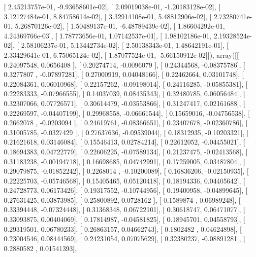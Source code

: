 \documentclass{article}
\begin{document}
       [  2.45213757e-01,  -9.93658601e-02],
       [  2.09019038e-01,  -1.20183128e-02],
       [  3.12127484e-01,   8.84758614e-02],
       [  3.32914108e-01,   5.48812906e-02],
       [  2.73280741e-01,   5.26870126e-02],
       [  1.50489137e-01,  -6.48789439e-02],
       [  1.86604292e-01,   4.24369766e-03],
       [  1.78773656e-01,   1.07142537e-01],
       [  1.98102186e-01,   2.19328524e-02],
       [  2.58106237e-01,   5.13442734e-02],
       [  2.50138343e-01,   1.48642191e-01],
       [  2.33429641e-01,   6.75065124e-02],
       [  1.87077524e-01,  -5.66150912e-02]]), array([[ 0.24097548,  0.0656408 ],
       [ 0.20274714, -0.0096079 ],
       [ 0.24344568, -0.08375786],
       [ 0.3277807 , -0.07897281],
       [ 0.27000919,  0.04048166],
       [ 0.22462664,  0.03101748],
       [ 0.22084361,  0.06010968],
       [ 0.22157262, -0.09198014],
       [ 0.24116285, -0.05855381],
       [ 0.22283333, -0.07966555],
       [ 0.14037039,  0.08435343],
       [ 0.32480785,  0.06056484],
       [ 0.32307066,  0.07726571],
       [ 0.30614479, -0.03553866],
       [ 0.31247417,  0.02161688],
       [ 0.22269597, -0.04407199],
       [ 0.29968558, -0.06661544],
       [ 0.15659016, -0.04756538],
       [ 0.2662078 , -0.0203094 ],
       [ 0.24619761, -0.08366651],
       [ 0.23407678, -0.02360786],
       [ 0.31005785, -0.0327429 ],
       [ 0.27637636, -0.09539044],
       [ 0.18312935, -0.10203321],
       [ 0.21621618,  0.03146084],
       [ 0.15546413,  0.02784214],
       [ 0.22612052, -0.04455021],
       [ 0.18694383,  0.04722779],
       [ 0.22606225, -0.07589134],
       [ 0.21237475, -0.02413568],
       [ 0.31183238, -0.00194718],
       [ 0.16698685,  0.04742991],
       [ 0.17259005,  0.03487804],
       [ 0.29079875, -0.01852242],
       [ 0.2268014 , -0.10200089],
       [ 0.16836206, -0.02150935],
       [ 0.22225703, -0.05746568],
       [ 0.15405465,  0.05120418],
       [ 0.18194336,  0.04405642],
       [ 0.24728773,  0.06173426],
       [ 0.19317552, -0.10744956],
       [ 0.19400958, -0.04899645],
       [ 0.27631425,  0.03873985],
       [ 0.25800892,  0.0728162 ],
       [ 0.1589874 ,  0.06989248],
       [ 0.33394448, -0.07324448],
       [ 0.31368348,  0.06722101],
       [ 0.30618747,  0.06471077],
       [ 0.33093875,  0.00404069],
       [ 0.17814987, -0.04581825],
       [ 0.18945701,  0.04558793],
       [ 0.29319501,  0.06780233],
       [ 0.26863157,  0.04662743],
       [ 0.1802482 ,  0.04624898],
       [ 0.23004546,  0.08444569],
       [ 0.24231054,  0.07075629],
       [ 0.32380237, -0.08891281],
       [ 0.2880582 ,  0.01541393],
\end{document}

